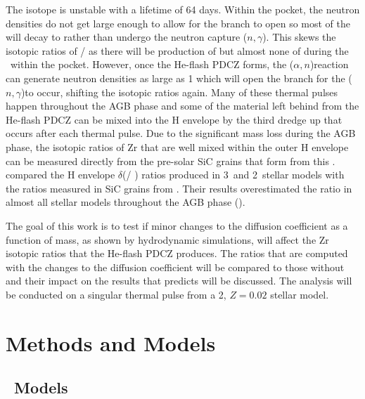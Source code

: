 \documentclass[fleqn,usenatbib]{mnras}
\begin{document}
The \zirconium[95] isotope is unstable with a lifetime of 64 days. Within the \carbon[13] pocket, the neutron densities do not get large enough to allow for the \zirconium[95] branch to open so most of the \zirconium[95] will decay to \molybdenum[95] rather than undergo the neutron capture \zirconium[95]($n,\gamma$)\zirconium[96]. This skews the isotopic ratios of \zirconium[96] / \zirconium[94] as there will be production of \zirconium[94] but almost none of \zirconium[96] during the \spr~within the \carbon[13] pocket. However, once the He-flash PDCZ forms, the \neon[22]($\alpha,n$)\magnesium[25] reaction can generate neutron densities as large as 1  which will open the branch for the \zirconium[95]($n,\gamma$)\zirconium[96] to occur, shifting the isotopic ratios again. Many of these thermal pulses happen throughout the AGB phase and some of the material left behind from the He-flash PDCZ can be mixed into the H envelope by the third dredge up that occurs after each thermal pulse. Due to the significant mass loss during the AGB phase, the isotopic ratios of Zr that are well mixed within the outer H envelope can be measured directly from the pre-solar SiC grains that form from this \citep{grain}. \citet{zr} compared the H envelope $\delta$(\zirconium[96] / \zirconium[94]) ratios produced in 3\Msun~and 2\Msun~stellar models with the ratios measured in SiC grains from \citet{grain}. Their results overestimated the ratio in almost all stellar models throughout the AGB phase ().

The goal of this work is to test if minor changes to the diffusion coefficient as a function of mass, as shown by hydrodynamic simulations, will affect the Zr isotopic ratios that the He-flash PDCZ produces. The ratios that are computed with the changes to the diffusion coefficient will be compared to those without and their impact on the results that \citet{zr} predicts will be discussed. The analysis will be conducted on a singular thermal pulse from a 2\Msun, $Z=0.02$ stellar model.

\section{Methods and Models}

\subsection{\MESA~Models}
\label{sec:mesa_models} %
\end{document}

